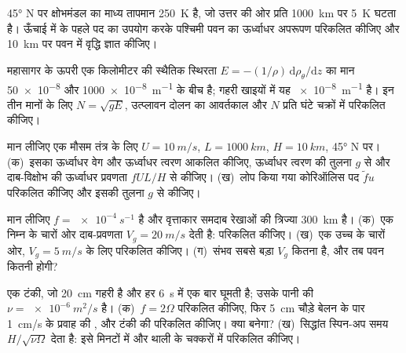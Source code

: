 \begin{exercise}[$\star$]\label{exo:b3:gfd-foundations:3}
\ang{45} N पर क्षोभमंडल का माध्य तापमान \qty{250}{K} है, जो उत्तर की ओर
प्रति \qty{1000}{km} पर \qty{5}{K} घटता है। ऊँचाई में  के पहले पद का उपयोग करके
पश्चिमी पवन का ऊर्ध्वाधर अपरूपण परिकलित कीजिए और
\qty{10}{km} पर पवन में वृद्धि ज्ञात कीजिए।
\end{exercise}

\begin{exercise}[$\star$]\label{exo:b3:gfd-foundations:4}
महासागर के ऊपरी एक किलोमीटर की स्थैतिक स्थिरता $E = -(1/\rho)\,\mathrm d\rho_\theta/\mathrm dz$
का मान \num{50e-8} और \qty{1000e-8}{m^{-1}} के बीच है;
गहरी खाइयों में यह \qty{e-8}{m^{-1}} है। इन तीन मानों के लिए $N = \sqrt{gE}$,
उत्प्लावन दोलन का आवर्तकाल और $N$ प्रति घंटे चक्रों में
परिकलित कीजिए।
\end{exercise}

\begin{exercise}[$\star\star$]\label{exo:b3:gfd-foundations:5}
मान लीजिए एक मौसम तंत्र के लिए $U = \qty{10}{m/s}$, $L = \qty{1000}{km}$, $H =
\qty{10}{km}$, \ang{45} N पर। (क)~इसका ऊर्ध्वाधर वेग और ऊर्ध्वाधर त्वरण आकलित कीजिए,
ऊर्ध्वाधर त्वरण की तुलना $g$ से और
दाब-विक्षोभ की ऊर्ध्वाधर प्रवणता $fUL/H$ से कीजिए। (ख)~लोप किया गया कोरिऑलिस पद
$\tilde fu$ परिकलित कीजिए और इसकी तुलना $g$ से कीजिए।
\end{exercise}

\begin{exercise}[$\star\star$]\label{exo:b3:gfd-foundations:6}
मान लीजिए $f = \qty{e-4}{s^{-1}}$ है और वृत्ताकार समदाब रेखाओं की त्रिज्या
\qty{300}{km} है। (क)~एक निम्न के चारों ओर दाब-प्रवणता $V_g =
\qty{20}{m/s}$ देती है:  परिकलित कीजिए। (ख)~एक उच्च के चारों ओर,
$V_g = \qty{5}{m/s}$ के लिए  परिकलित कीजिए। (ग)~संभव सबसे बड़ा
$V_g$ कितना है, और तब पवन कितनी होगी?
\end{exercise}

\begin{exercise}[$\star\star$]\label{exo:b3:gfd-foundations:7}
एक टंकी, जो \qty{20}{cm} गहरी है और हर \qty{6}{s} में एक बार घूमती है; उसके पानी की $\nu =
\qty{e-6}{m^2/s}$ है। (क)~$f = 2\Omega$ परिकलित कीजिए, फिर
\qty{5}{cm} चौड़े बेलन के पार \qty{1}{cm/s} के प्रवाह की , और
टंकी की  परिकलित कीजिए। क्या  बनेगा? (ख)~सिद्धांत स्पिन-अप
समय $H/\sqrt{\nu\Omega}$ देता है: इसे मिनटों में और थाली के चक्करों में परिकलित कीजिए।
\end{exercise}

